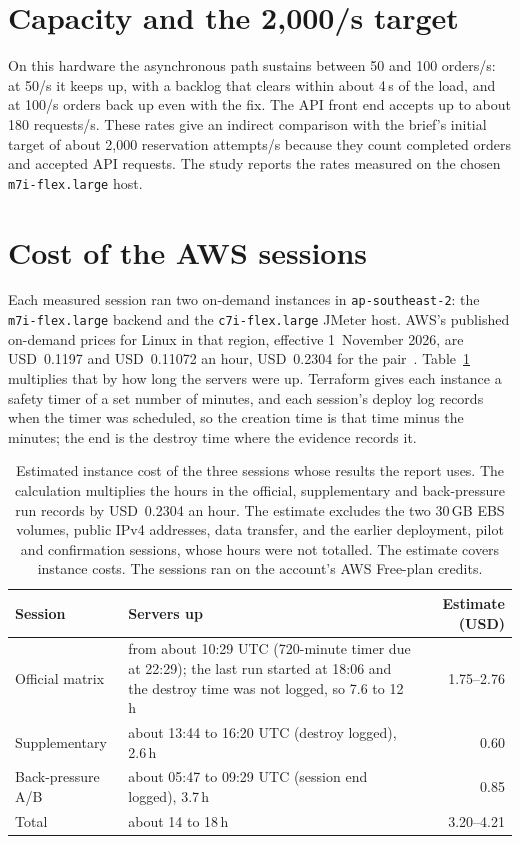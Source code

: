 \documentclass[a4paper]{report}
\begin{document}
\section{Capacity and the 2,000/s target}
\label{sec:capacity}

On this hardware the asynchronous path sustains between 50 and 100 orders/s: at
50/s it keeps up, with a backlog that clears within about 4\,s of the load,
and at 100/s orders back up even with the fix.
The API front end accepts up to about 180 requests/s. These rates give an
indirect comparison with the brief's initial target of about 2,000 reservation
attempts/s because they count completed orders and accepted API requests.
The study reports the rates measured on the chosen
\texttt{m7i-flex.large} host.

\section{Cost of the AWS sessions}
\label{sec:cost}

Each measured session ran two on-demand instances in \texttt{ap-southeast-2}:
the \texttt{m7i-flex.large} backend and the \texttt{c7i-flex.large} JMeter host.
AWS's published on-demand prices for Linux in that region, effective
1~November 2026, are USD~0.1197 and USD~0.11072 an hour, USD~0.2304 for the
pair~\cite{aws-ec2-pricing}. Table~\ref{tab:cost} multiplies that by how long
the servers were up. Terraform gives each instance a safety timer of a set
number of minutes, and each session's deploy log records when the timer was
scheduled, so the creation time is that time minus the minutes; the end is
the destroy time where the evidence records it.

\begin{table}[H]
\centering
\small
\begin{tabular}{@{}p{3.9cm}p{6.6cm}r@{}}
\toprule
Session & Servers up & Estimate (USD) \\
\midrule
Official matrix & from about 10:29 UTC (720-minute timer due at 22:29); the last
  run started at 18:06 and the destroy time was not logged, so 7.6 to 12\,h & 1.75--2.76 \\
Supplementary & about 13:44 to 16:20 UTC (destroy logged), 2.6\,h & 0.60 \\
Back-pressure A/B & about 05:47 to 09:29 UTC (session end logged), 3.7\,h & 0.85 \\
\midrule
Total & about 14 to 18\,h & 3.20--4.21 \\
\bottomrule
\end{tabular}
\caption{Estimated instance cost of the three sessions whose results the report
uses. The calculation multiplies the hours in the official, supplementary
and back-pressure run records by USD~0.2304 an hour. The estimate excludes
the two 30\,GB EBS volumes, public IPv4 addresses, data transfer, and
the earlier deployment, pilot and confirmation sessions, whose hours were not
totalled. The estimate covers instance costs.
The sessions ran on the account's AWS Free-plan credits.}
\label{tab:cost}
\end{table}
\end{document}
